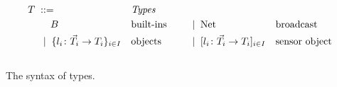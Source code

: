 \begin{myfigure}
\begin{align*}
  & T \grmeq & & \text{\emph{Types}}
  \\
  & \qquad \; B & & \text{built-ins} & &
                        \quad \grmor  \netTypek & & \text{broadcast}
  \\
  & \quad \grmor  \objd & & \text{objects} & &
                        \quad \grmor  \senObjd & & \text{sensor object}
\end{align*}
\\[-0.4cm]
\caption{The syntax of types.}
\label{fig:syntax-types}
\end{myfigure}

